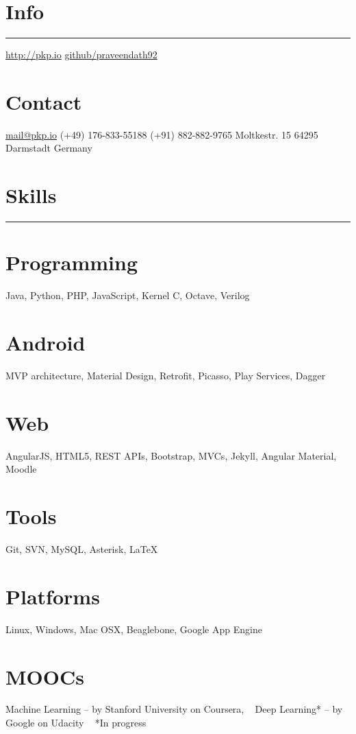 \documentclass[]{friggeri-cv}
\begin{document}

\begin{aside}
  \section{Info}
    \noindent\rule{3cm}{0.5pt}
    \href{http://pkp.io}{http://pkp.io}
    \href{https://github.com/praveendath92}{github/praveendath92}    
  \section{Contact}
    \href{mailto:mail@pkp.io}{mail@pkp.io}
    (+49) 176-833-55188
    (+91) 882-882-9765
    Moltkestr. 15
    64295 Darmstadt
    Germany
    ~
  \section{Skills}
    \noindent\rule{3cm}{0.5pt}
  \section{Programming}
    Java, Python, PHP, JavaScript, Kernel C, Octave, Verilog
  \section{Android}
    MVP architecture, Material Design, Retrofit, Picasso, Play Services, Dagger
  \section{Web}
    AngularJS, HTML5, REST APIs, Bootstrap, MVCs, Jekyll, Angular Material, Moodle
  \section{Tools}
    Git, SVN, MySQL, Asterisk, \LaTeX
  \section{Platforms}
    Linux, Windows, Mac OSX, Beaglebone, Google App Engine
  \section{MOOCs}
    Machine Learning -- by Stanford University on Coursera, 
    ~
    Deep Learning* -- by Google on Udacity
	~    
    *In progress
\end{aside}
~
\end{document}
